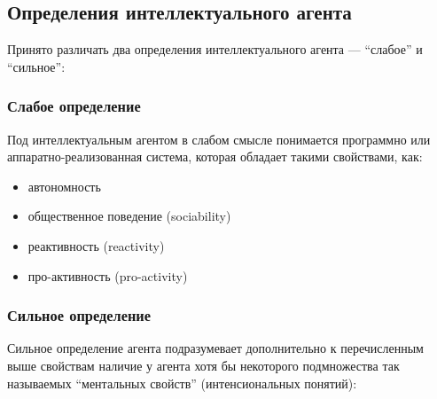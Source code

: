 \subsection{Определения интеллектуального агента}

Принято различать два определения интеллектуального агента — ``слабое'' и ``сильное'':

\subsubsection{Слабое определение}

Под интеллектуальным агентом в слабом смысле понимается программно или аппаратно-реализованная система, которая обладает такими свойствами, как:

\begin{itemize}
  \item автономность
  \item общественное поведение (sociability)
  \item реактивность (reactivity)
  \item про-активность (pro-activity)
\end{itemize}

\subsubsection{Сильное определение}

Сильное определение агента подразумевает дополнительно к перечисленным выше свойствам наличие у агента хотя бы некоторого подмножества так называемых ``ментальных свойств'' (интенсиональных понятий):

